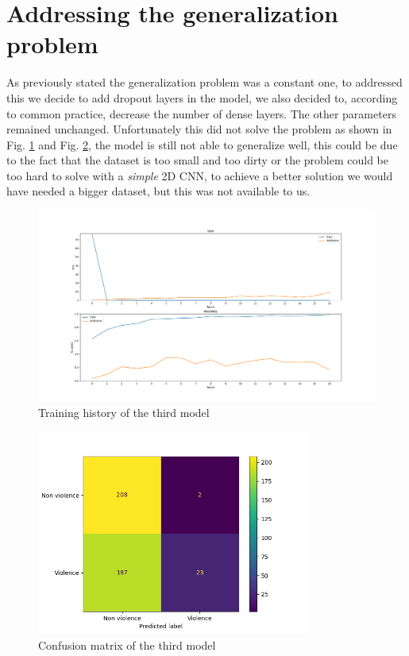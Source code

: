 \section{Addressing the generalization problem}
As previously stated the generalization problem was a constant one, to addressed this we decide to add dropout layers in the model, we also decided to, according to common practice, decrease the number of dense layers. The other parameters remained unchanged. Unfortunately this did not solve the problem as shown in Fig. \ref{fig:Third2DCNNHistory} and Fig. \ref{fig:Third2DCNNMatrix}, the model is still not able to generalize well, this could be due to the fact that the dataset is too small and too dirty or the problem could be too hard to solve with a \textit{simple} 2D CNN, to achieve a better solution we would have needed a bigger dataset, but this was not available to us.
\begin{figure}[]
    \centering
    \includegraphics[width=1\textwidth]{images/731a-2DFabioFinal-86ad-history.png}
    \caption{Training history of the third model}
    \label{fig:Third2DCNNHistory}
\end{figure}
\begin{figure}[]
    \centering
    \includegraphics[width=0.8\textwidth]{images/731a-2DFabioFinal-86ad-conf_matrix.png}
    \caption{Confusion matrix of the third model}
    \label{fig:Third2DCNNMatrix}
\end{figure}
\pagebreak
